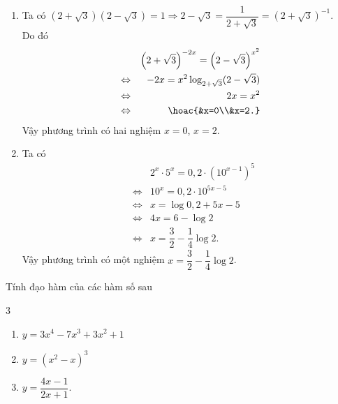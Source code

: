 \begin{bt}
{\begin{enumerate}
\begin{eqnarray*}
				 &\Leftrightarrow& x^2+(2-\log_5 2)x+(\log_5 2 -3)=0 \\
				 &\Leftrightarrow& \hoac{&x=1\\&x=-3+\log_5 2.}
			\end{eqnarray*}
			Vậy  phương trình có hai nghiệm $x=1$, $x=-3+\log_5 2$.
			 \item
			Ta có $(2+\sqrt{3})(2-\sqrt{3})=1  \Rightarrow 2-\sqrt{3}=\dfrac{1}{2+\sqrt{3}}=(2+\sqrt{3})^{-1}$.\\
			 Do đó
			\begin{eqnarray*}
				&&\left(2+\sqrt{3}\right)^{-2x}=\left(2-\sqrt{3}\right)^{x^2} \\ &\Leftrightarrow& -2x=x^2\log_{2+\sqrt{3}} (2-\sqrt{3})  \\
				&\Leftrightarrow& 2x=x^2  \\
				 &\Leftrightarrow& \hoac{&x=0\\&x=2.}\\
			\end{eqnarray*}
			Vậy phương trình có hai  nghiệm $x=0$, $x=2$.
			\item Ta  có
			\begin{eqnarray*}
				&&2^x\cdot 5^x=0{,}2\cdot \left(10^{x-1}\right)^5  \\
				 &\Leftrightarrow& 10^x=0{,}2\cdot 10^{5x-5}\\
				 &\Leftrightarrow& x=\log 0{,}2 +5x-5\\
				&\Leftrightarrow& 4x=6-\log  2\\
				&\Leftrightarrow& x=\dfrac{3}{2}-\dfrac{1}{4}\log 2. 
			\end{eqnarray*}
			Vậy phương trình có một nghiệm $x=\dfrac{3}{2}-\dfrac{1}{4}\log 2$. 
		\end{enumerate}
	 }
\end{bt}

\begin{bt}%
	Tính đạo hàm của các hàm số sau
	\begin{multicols}{3}
	\begin{enumerate}
		\item $y=3 x^4-7 x^3+3 x^2+1$
		\item $y=\left(x^2-x\right)^3$
		\item $y=\dfrac{4 x-1}{2 x+1}$.
	\end{enumerate}
	\end{multicols}	
\end{bt}

